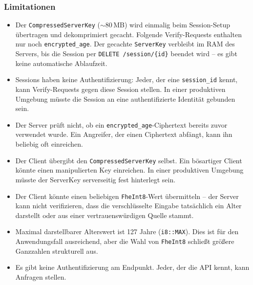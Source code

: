 \subsubsection{Limitationen}
\begin{itemize}
  \item Der \texttt{CompressedServerKey} (${\sim}80$\,MB) wird einmalig beim Session-Setup übertragen und dekomprimiert gecacht. Folgende Verify-Requests enthalten nur noch \texttt{encrypted\_age}. Der gecachte \texttt{ServerKey} verbleibt im RAM des Servers, bis die Session per \texttt{DELETE /session/\{id\}} beendet wird -- es gibt keine automatische Ablaufzeit.

  \item Sessions haben keine Authentifizierung: Jeder, der eine \texttt{session\_id} kennt, kann Verify-Requests gegen diese Session stellen. In einer produktiven Umgebung müsste die Session an eine authentifizierte Identität gebunden sein.

  \item Der Server prüft nicht, ob ein \texttt{encrypted\_age}-Ciphertext bereits zuvor verwendet wurde. Ein Angreifer, der einen Ciphertext abfängt, kann ihn beliebig oft einreichen.

  \item Der Client übergibt den \texttt{CompressedServerKey} selbst. Ein bösartiger Client könnte einen manipulierten Key einreichen. In einer produktiven Umgebung müsste der ServerKey serverseitig fest hinterlegt sein.

  \item Der Client könnte einen beliebigen \texttt{FheInt8}-Wert übermitteln -- der Server kann nicht verifizieren, dass die verschlüsselte Eingabe tatsächlich ein Alter darstellt oder aus einer vertrauenswürdigen Quelle stammt.

  \item Maximal darstellbarer Alterswert ist 127 Jahre (\texttt{i8::MAX}). Dies ist für den Anwendungsfall ausreichend, aber die Wahl von \texttt{FheInt8} schließt größere Ganzzahlen strukturell aus.

  \item Es gibt keine Authentifizierung am Endpunkt. Jeder, der die API kennt, kann Anfragen stellen.
\end{itemize}